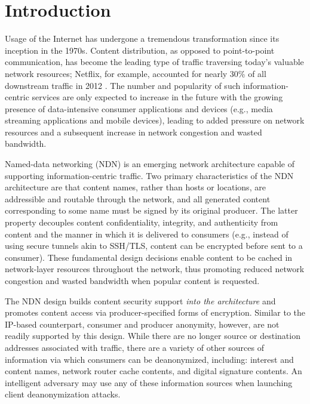 \section{Introduction} \label{sec:introduction}
Usage of the Internet has undergone a tremendous transformation since its inception in the 1970s. Content distribution, as opposed to point-to-point communication, has become the leading type of traffic traversing today's valuable network resources; Netflix, for example, accounted for nearly 30\% of all downstream traffic in 2012 \cite{Netflix}. The number and popularity of such information-centric services are only expected to increase in the future with the growing presence of data-intensive consumer applications and devices (e.g., media streaming applications and mobile devices), leading to added pressure on network resources and a subsequent increase in network congestion and wasted bandwidth. 

Named-data networking (NDN) \cite{ndn-techreport} is an emerging network architecture capable of supporting information-centric traffic. Two primary characteristics of the NDN architecture are that content names, rather than hosts or locations, are addressible and routable through the network, and all generated content corresponding to some name must be signed by its original producer. The latter property decouples content confidentiality, integrity, and authenticity from content and the manner in which it is delivered to consumers (e.g., instead of using secure tunnels akin to SSH/TLS, content can be encrypted before sent to a consumer). These fundamental design decisions enable content to be cached in network-layer resources throughout the network, thus promoting reduced network congestion and wasted bandwidth when popular content is requested. 

The NDN design builds content security support \emph{into the architecture} and promotes content access via producer-specified forms of encryption. Similar to the IP-based counterpart, consumer and producer anonymity, however, are not readily supported by this design. While there are no longer source or destination addresses associated with traffic, there are a variety of other sources of information via which consumers can be deanonymized, including: interest and content names, network router cache contents, and digital signature contents. An intelligent adversary may use any of these information sources when launching client deanonymization attacks. 

